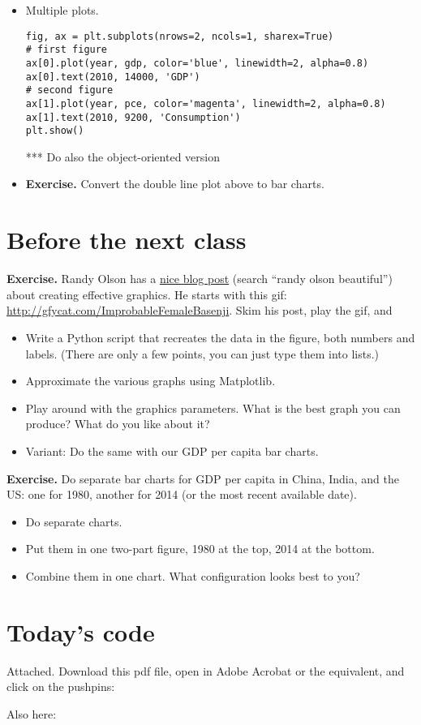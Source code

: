 \documentclass[11pt]{article}
\begin{document}
\begin{itemize}
\item Multiple plots.
\begin{verbatim}
fig, ax = plt.subplots(nrows=2, ncols=1, sharex=True)
# first figure
ax[0].plot(year, gdp, color='blue', linewidth=2, alpha=0.8)
ax[0].text(2010, 14000, 'GDP')
# second figure
ax[1].plot(year, pce, color='magenta', linewidth=2, alpha=0.8)
ax[1].text(2010, 9200, 'Consumption')
plt.show()
\end{verbatim}

*** Do also the object-oriented version

\item {\bf Exercise.}
Convert the double line plot above to bar charts.


\end{itemize}



\section{Before the next class}

{\bf Exercise.}
Randy Olson has a
\href{http://www.randalolson.com/2014/06/28/how-to-make-beautiful-data-visualizations-in-python-with-matplotlib/}
{nice blog post} (search ``randy olson beautiful'')
about creating effective graphics.
He starts with this gif:
\url{http://gfycat.com/ImprobableFemaleBasenji}.
Skim his post, play the gif, and
%
\begin{itemize}
\item  Write a Python script that recreates the data in the figure,
both numbers and labels.
(There are only a few points, you can just type them into lists.)
\item Approximate the various graphs using Matplotlib.
\item Play around with the graphics parameters.
What is the best graph you can produce?
What do you like about it?
\item Variant:  Do the same with our GDP per capita bar charts.
\end{itemize}

{\bf Exercise.\/}
Do separate bar charts for GDP per capita in China, India, and the US:
one for 1980, another for 2014 (or the most recent available date).
\begin{itemize}
\item Do separate charts.
\item Put them in one two-part figure, 1980 at the top, 2014 at the bottom.
\item Combine them in one chart.  What configuration looks best to you?
\end{itemize}


\section*{Today's code}

Attached.  Download this pdf file, open in Adobe Acrobat or the equivalent,
and click on the pushpins:

Also here:
{\small

}
\end{document}
